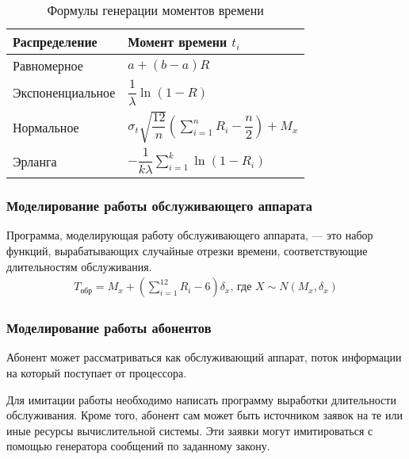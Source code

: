 \begin{table}[H]
    \renewcommand{\arraystretch}{1.5}
    \caption{Формулы генерации моментов времени}
    \begin{tabularx}{\textwidth} {
            >{\raggedright\arraybackslash}X
            >{\centering\arraybackslash}X}
        \toprule
        \textbf{Распределение} & \textbf{Момент времени $t_i$}                                                                \\
        \midrule
        Равномерное            & ${a + (b - a)R}$                                                                             \\\rule{0pt}{5ex}%
        Экспоненциальное       & ${\dfrac{1}{\lambda}\ln(1 - R)}$                                                             \\\rule{0pt}{6ex}%
        Нормальное             & ${\sigma_t\sqrt{\dfrac{12}{n}}}\left(\sum\limits_{i = 1}^n R_i - \dfrac{n}{2} \right) + M_x$ \\\rule{0pt}{5ex}%
        Эрланга                & ${-\dfrac{1}{k\lambda}}\sum\limits_{i=1}^k\ln(1-R_i)$                                        \\
        \bottomrule
    \end{tabularx}
\end{table}

\subsubsection{Моделирование работы обслуживающего аппарата}

Программа, моделирующая работу обслуживающего аппарата, --- это набор функций, вырабатывающих случайные отрезки времени, соответствующие длительностям обслуживания.
%
\begin{gather*}
    T_{\text{обр}} = M_x + \left(\sum\limits_{i = 1}^{12}R_i - 6\right)\delta_x,\,\text{где } X\sim N(M_x, \delta_x)
\end{gather*}
%

\subsubsection{Моделирование работы абонентов}

Абонент может рассматриваться как обслуживающий аппарат, поток информации на который поступает от процессора.

Для имитации работы необходимо написать программу выработки длительности обслуживания. Кроме того, абонент сам может быть источником заявок на те или иные ресурсы вычислительной системы. Эти заявки могут имитироваться с помощью генератора сообщений по заданному закону.

